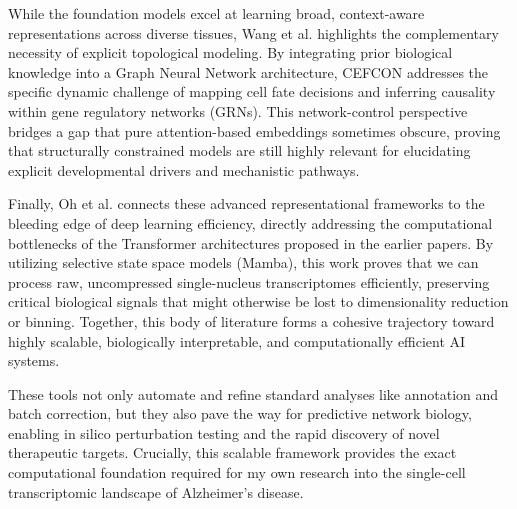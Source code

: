 \documentclass[12pt]{article}
\begin{document}
While the foundation models excel at learning broad, context-aware representations across diverse tissues, Wang et al. \cite{wang2023deciphering} highlights the complementary necessity of explicit topological modeling. By integrating prior biological knowledge into a Graph Neural Network architecture, CEFCON addresses the specific dynamic challenge of mapping cell fate decisions and inferring causality within gene regulatory networks (GRNs). This network-control perspective bridges a gap that pure attention-based embeddings sometimes obscure, proving that structurally constrained models are still highly relevant for elucidating explicit developmental drivers and mechanistic pathways.

Finally, Oh et al. \cite{oh2025scmamba} connects these advanced representational frameworks to the bleeding edge of deep learning efficiency, directly addressing the computational bottlenecks of the Transformer architectures proposed in the earlier papers. By utilizing selective state space models (Mamba), this work proves that we can process raw, uncompressed single-nucleus transcriptomes efficiently, preserving critical biological signals that might otherwise be lost to dimensionality reduction or binning. Together, this body of literature forms a cohesive trajectory toward highly scalable, biologically interpretable, and computationally efficient AI systems.

These tools not only automate and refine standard analyses like annotation and batch correction, but they also pave the way for predictive network biology, enabling in silico perturbation testing and the rapid discovery of novel therapeutic targets. Crucially, this scalable framework provides the exact computational foundation required for my own research into the single-cell transcriptomic landscape of Alzheimer's disease.


\end{document}
